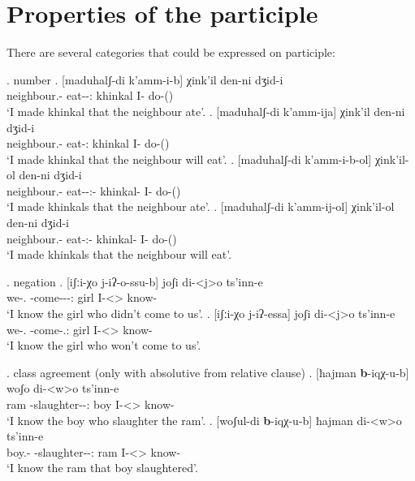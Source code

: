 \section{Properties of the participle}
There are several categories that could be expressed on participle:

\ex. number
	\ag. [maduhalʃ-di k'amm-i-b] χink'il den-ni dʒid-i\\
			{neighbour.\Obl-\Erg} {eat-\Pst-\Ptcp:\Pst} {khinkal}  {I-\Erg} {do-\Pst(\Aor)}\\
		 \glt    `I made khinkal that the neighbour ate'.
	\bg. [maduhalʃ-di k'amm-ija] χink'il den-ni dʒid-i\\
			{neighbour.\Obl-\Erg} {eat-\Ptcp:\Fut} {khinkal}  {I-\Erg} {do-\Pst(\Aor)}\\
		 \glt    `I made khinkal that the neighbour will eat'.	
	\bg. [maduhalʃ-di k'amm-i-b-ol] χink'il-ol den-ni dʒid-i\\
			{neighbour.\Obl-\Erg} {eat-\Pst-\Ptcp:\Pst-\Pl} {khinkal-\Pl}  {I-\Erg} {do-\Pst(\Aor)}\\
		 \glt    `I made khinkals that the neighbour ate'.
	\bg. [maduhalʃ-di k'amm-ij-ol] χink'il-ol den-ni dʒid-i\\
			{neighbour.\Obl-\Erg} {eat-\Ptcp:\Fut-\Pl} {khinkal-\Pl}  {I-\Erg} {do-\Pst(\Aor)}\\
		 \glt    `I made khinkals that the neighbour will eat'.	

\ex. negation
	\ag. [iʃːi-χo j-iʔ-o-ssu-b] joʃi di-<j>o ts'inn-e \\
		  {we-\Add.\Lat} {\F-come-\Pst-\Neg-\Ptcp:\Pst} {girl} {I-<\F>\Aff} {know-\Hab}\\
		 \glt    `I know the girl who didn't come to us'.
	\bg. [iʃːi-χo j-iʔ-essa] joʃi di-<j>o ts'inn-e \\
		  {we-\Add.\Lat} {\F-come-\Neg.\Ptcp:\Fut} {girl} {I-<\F>\Aff} {know-\Hab}\\
		 \glt    `I know the girl who won't come to us'.
		 
\ex. class agreement (only with absolutive from relative clause)
	\ag. [ħajman \textbf{b}-iqχ-u-b] woʃo di-<w>o ts'inn-e \\
			ram {\Nanf-slaughter-\Pst-\Ptcp:\Pst} boy {I-<\M>\Aff} {know-\Hab}\\
			\glt `I know the boy who slaughter the ram'.
	\bg. [woʃul-di \textbf{b}-iqχ-u-b] ħajman di-<w>o ts'inn-e \\
			{boy.\Obl-\Erg} {\Nanf-slaughter-\Pst-\Ptcp:\Pst} ram {I-<\M>\Aff} {know-\Hab}\\
			\glt `I know the ram that boy slaughtered'.	
			
